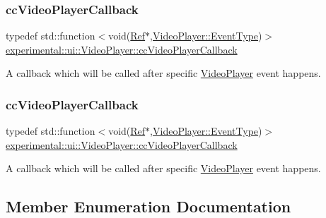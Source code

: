 \subsubsection{\texorpdfstring{cc\+Video\+Player\+Callback}{ccVideoPlayerCallback}\hspace{0.1cm}{\footnotesize\ttfamily [1/2]}}
{\footnotesize\ttfamily typedef std\+::function$<$void(\hyperlink{classRef}{Ref}$\ast$,\hyperlink{classexperimental_1_1ui_1_1VideoPlayer_a29899b427d61c030036fda6c5ddcb10a}{Video\+Player\+::\+Event\+Type})$>$ \hyperlink{classexperimental_1_1ui_1_1VideoPlayer_a64ebf250429fec0efea303b13cecf02e}{experimental\+::ui\+::\+Video\+Player\+::cc\+Video\+Player\+Callback}}

A callback which will be called after specific \hyperlink{classexperimental_1_1ui_1_1VideoPlayer}{Video\+Player} event happens. \mbox{\label{classexperimental_1_1ui_1_1VideoPlayer_a64ebf250429fec0efea303b13cecf02e}} 
\subsubsection{\texorpdfstring{cc\+Video\+Player\+Callback}{ccVideoPlayerCallback}\hspace{0.1cm}{\footnotesize\ttfamily [2/2]}}
{\footnotesize\ttfamily typedef std\+::function$<$void(\hyperlink{classRef}{Ref}$\ast$,\hyperlink{classexperimental_1_1ui_1_1VideoPlayer_a29899b427d61c030036fda6c5ddcb10a}{Video\+Player\+::\+Event\+Type})$>$ \hyperlink{classexperimental_1_1ui_1_1VideoPlayer_a64ebf250429fec0efea303b13cecf02e}{experimental\+::ui\+::\+Video\+Player\+::cc\+Video\+Player\+Callback}}

A callback which will be called after specific \hyperlink{classexperimental_1_1ui_1_1VideoPlayer}{Video\+Player} event happens. 

\subsection{Member Enumeration Documentation}
\mbox{\label{classexperimental_1_1ui_1_1VideoPlayer_a29899b427d61c030036fda6c5ddcb10a}} 
